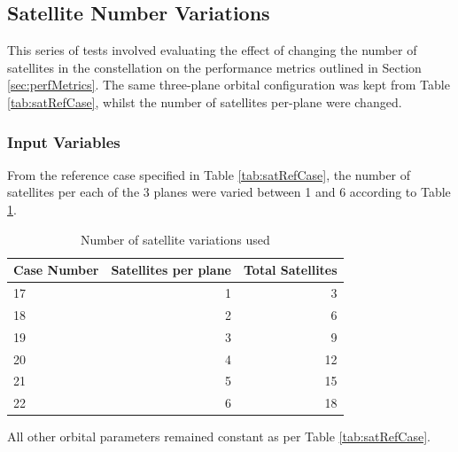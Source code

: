\newpage
\subsection{Satellite Number Variations}
This series of tests involved evaluating the effect of changing the number of satellites in the constellation on the performance metrics outlined in Section \ref{sec:perfMetrics}. The same three-plane orbital configuration was kept from Table \ref{tab:satRefCase}, whilst the number of satellites per-plane were changed. 
\subsubsection{Input Variables}
From the reference case specified in Table \ref{tab:satRefCase}, the number of satellites per each of the 3 planes were varied between 1 and 6 according to Table \ref{tab:perPlaneParams}.

\begin{table}[H]
  \centering
  \caption{Number of satellite variations used}
    \begin{tabular}{p{2.5cm}rr}
    \toprule
    Case Number & Satellites per plane & Total Satellites \\
    \midrule
    17    & 1     & 3 \\
    18    & 2     & 6 \\
    19    & 3     & 9 \\
    20    & 4     & 12 \\
    21    & 5     & 15 \\
    22    & 6     & 18 \\

    \bottomrule
    \end{tabular}%
  \label{tab:perPlaneParams}%
\end{table}%
All other orbital parameters remained constant as per Table \ref{tab:satRefCase}.

